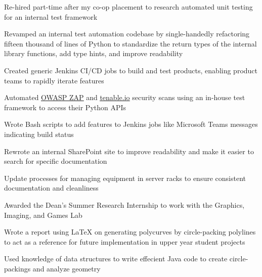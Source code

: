 \begin{bullets}
    \item Re-hired part-time after my co-op placement to research automated unit testing for an internal test framework
    \item Revamped an internal test automation codebase by single-handedly refactoring fifteen thousand of lines of Python to standardize the return types of the internal library functions, add type hints, and improve readability
    \item Created generic Jenkins CI/CD jobs to build and test products, enabling product teams to rapidly iterate features
    \item Automated \href{https://www.zaproxy.org/}{\underline{OWASP ZAP}} and \href{https://www.tenable.com/products/tenable-io}{\underline{tenable.io}} security scans using an in-house test framework to access their Python APIs
    \item Wrote Bash scripts to add features to Jenkins jobs like Microsoft Teams messages indicating build status
    \item Rewrote an internal SharePoint site to improve readability and make it easier to search for specific documentation
    \item Update processes for managing equipment in server racks to ensure consistent documentation and cleanliness
\end{bullets}

\hbox{}

\begin{bullets}
    \item Awarded the Dean's Summer Research Internship to work with the Graphics, Imaging, and Games Lab
    \item Wrote a report using \LaTeX\hbox{} on generating polycurves by circle-packing polylines to act as a reference for future implementation in upper year student projects
    \item Used knowledge of data structures to write effecient Java code to create circle-packings and analyze geometry
\end{bullets}


